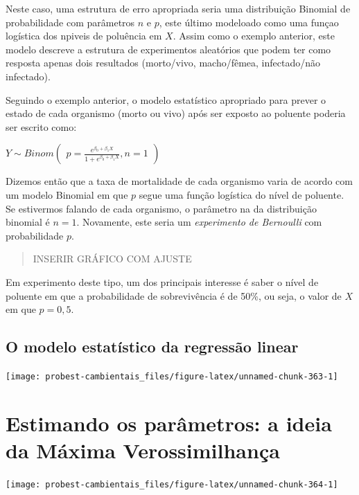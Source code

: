 \documentclass[
]{book}
\begin{document}
Neste caso, uma estrutura de erro apropriada seria uma distribuição Binomial de probabilidade com parâmetros \(n\) e \(p\), este último modeloado como uma funçao logística dos npiveis de poluência em \(X\). Assim como o exemplo anterior, este modelo descreve a estrutura de experimentos aleatórios que podem ter como resposta apenas dois resultados (morto/vivo, macho/fêmea, infectado/não infectado).

Seguindo o exemplo anterior, o modelo estatístico apropriado para prever o estado de cada organismo (morto ou vivo) após ser exposto ao poluente poderia ser escrito como:

\(Y ∼ Binom \left (\begin{array}{c} p = \frac{e^{\beta_0 + \beta_1 X}}{1 + e^{\beta_0 + \beta_1 X}}, n = 1 \end{array}\right)\)

Dizemos então que a taxa de mortalidade de cada organismo varia de acordo com um modelo Binomial em que \(p\) segue uma função logística do nível de poluente. Se estivermos falando de cada organismo, o parâmetro na da distribuição binomial é \(n = 1\). Novamente, este seria um \emph{experimento de Bernoulli} com probabilidade \(p\).

\begin{quote}
INSERIR GRÁFICO COM AJUSTE
\end{quote}

Em experimento deste tipo, um dos principais interesse é saber o nível de poluente em que a probabilidade de sobrevivência é de 50\%, ou seja, o valor de \(X\) em que \(p = 0,5\).

\hypertarget{o-modelo-estatuxedstico-da-regressuxe3o-linear}{%
\section{O modelo estatístico da regressão linear}\label{o-modelo-estatuxedstico-da-regressuxe3o-linear}}

\begin{center}\texttt{[image: probest-cambientais\_files/figure-latex/unnamed-chunk-363-1]} \end{center}

\hypertarget{emv}{%
\chapter{Estimando os parâmetros: a ideia da Máxima Verossimilhança}\label{emv}}

\begin{center}\texttt{[image: probest-cambientais\_files/figure-latex/unnamed-chunk-364-1]} \end{center}
\end{document}

